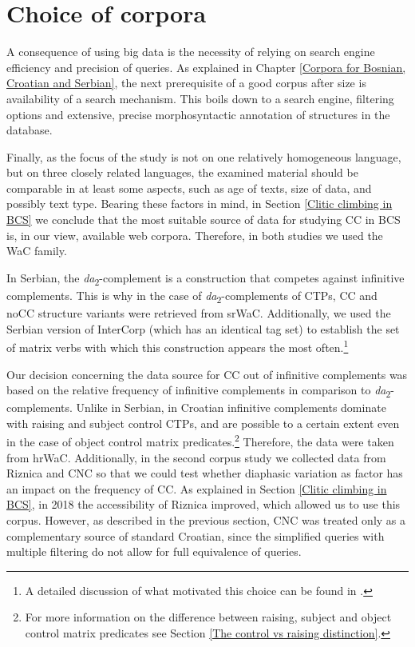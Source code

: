 \section{Choice of corpora}
\label{Choice of corpora}
A consequence of using big data is the necessity of relying on search engine efficiency and precision of queries. As explained in Chapter \ref{Corpora for Bosnian, Croatian and Serbian}, the next prerequisite of a good corpus after size is availability of a search mechanism. This boils down to a search engine, filtering options and extensive, precise morphosyntactic annotation of structures in the database.

Finally, as the focus of the study is not on one relatively homogeneous language, but on three closely related languages, the examined material should be comparable in at least some aspects, such as age of texts, size of data, and possibly text type. Bearing these factors in mind, in Section \ref{Clitic climbing in BCS} we conclude that the most suitable source of data for studying CC in BCS is, in our view, available web corpora. Therefore, in both studies we used the WaC family.

In Serbian, the \textit{da}\textsubscript{2}-complement is a construction that competes against infinitive complements. This is why in the case of \textit{da}\textsubscript{2}-complements of CTPs, CC and noCC structure variants  were retrieved from srWaC. Additionally, we used the Serbian version \citep{AdamovicovaVavrin20} of InterCorp \citep{CermakRosen12} (which has an identical tag set) to establish the set of matrix verbs with which this construction appears the most often.\footnote{A detailed discussion of what motivated this choice can be found in \citet*{JHK17a}.}

Our decision concerning the data source for CC out of infinitive complements was based on the relative frequency of infinitive complements in comparison to \textit{da}\textsubscript{2}-complements. Unlike in Serbian, in Croatian infinitive complements dominate with raising and subject control CTPs, and are possible to a certain extent even in the case of object control matrix predicates.\footnote{For more information on the difference between raising, subject and object control matrix predicates see Section \ref{The control vs raising distinction}.}  Therefore, the data were taken from hrWaC. Additionally, in the second corpus study we collected data from Riznica and CNC so that we could test whether diaphasic variation as factor has an impact on the frequency of CC. As explained in Section \ref{Clitic climbing in BCS}, in 2018 the accessibility of Riznica improved, which allowed us to use this corpus. However, as described in the previous section, CNC was treated only as a complementary source of standard Croatian, since the simplified queries with multiple filtering do not allow for full equivalence of queries. 

